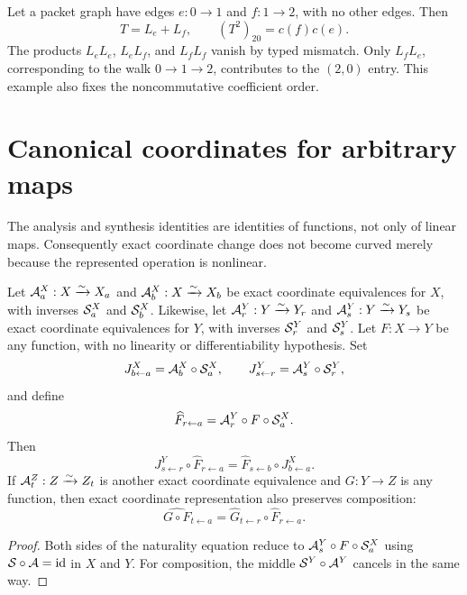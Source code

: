 \begin{example}
Let a packet graph have edges $e:0\to1$ and $f:1\to2$, with no other edges.
Then
\[
T=L_e+L_f,\qquad
(T^2)_{20}=c(f)c(e).
\]
The products $L_eL_e$, $L_eL_f$, and $L_fL_f$ vanish by typed mismatch.
Only $L_fL_e$, corresponding to the walk $0\to1\to2$, contributes to the
$(2,0)$ entry.  This example also fixes the noncommutative coefficient order.
\end{example}

\section{Canonical coordinates for arbitrary maps}
\label{sec:arbitrary-maps}

The analysis and synthesis identities are identities of functions, not only
of linear maps.  Consequently exact coordinate change does not become
curved merely because the represented operation is nonlinear.

\begin{proposition}
\label{prop:set-naturality}
Let $\mathcal A^X_a:X\xrightarrow{\sim}X_a$ and
$\mathcal A^X_b:X\xrightarrow{\sim}X_b$ be exact coordinate equivalences for $X$,
with inverses $\mathcal S^X_a$ and $\mathcal S^X_b$.  Likewise, let
$\mathcal A^Y_r:Y\xrightarrow{\sim}Y_r$ and
$\mathcal A^Y_s:Y\xrightarrow{\sim}Y_s$ be exact coordinate equivalences for $Y$,
with inverses $\mathcal S^Y_r$ and $\mathcal S^Y_s$.  Let $F:X\to Y$ be any function, with
no linearity or differentiability hypothesis.  Set
\[
J^X_{b\leftarrow a}=\mathcal A^X_b\circ\mathcal S^X_a,
\qquad
J^Y_{s\leftarrow r}=\mathcal A^Y_s\circ\mathcal S^Y_r,
\]
and define
\[
\widehat F_{r\leftarrow a}
=
\mathcal A^Y_r\circ F\circ\mathcal S^X_a.
\]
Then
\[
J^Y_{s\leftarrow r}\circ\widehat F_{r\leftarrow a}
=
\widehat F_{s\leftarrow b}\circ J^X_{b\leftarrow a}.
\]
If $\mathcal A^Z_t:Z\xrightarrow{\sim}Z_t$ is another exact coordinate equivalence
and $G:Y\to Z$ is any function, then exact coordinate representation also
preserves composition:
\[
\widehat{G\circ F}_{t\leftarrow a}
=
\widehat G_{t\leftarrow r}\circ\widehat F_{r\leftarrow a}.
\]
\end{proposition}

\begin{proof}
Both sides of the naturality equation reduce to
$\mathcal A^Y_s\circ F\circ\mathcal S^X_a$ using
$\mathcal S\circ\mathcal A=\operatorname{id}$ in $X$ and $Y$.  For composition, the middle
$\mathcal S^Y\circ\mathcal A^Y$ cancels in the same way.
\end{proof}

